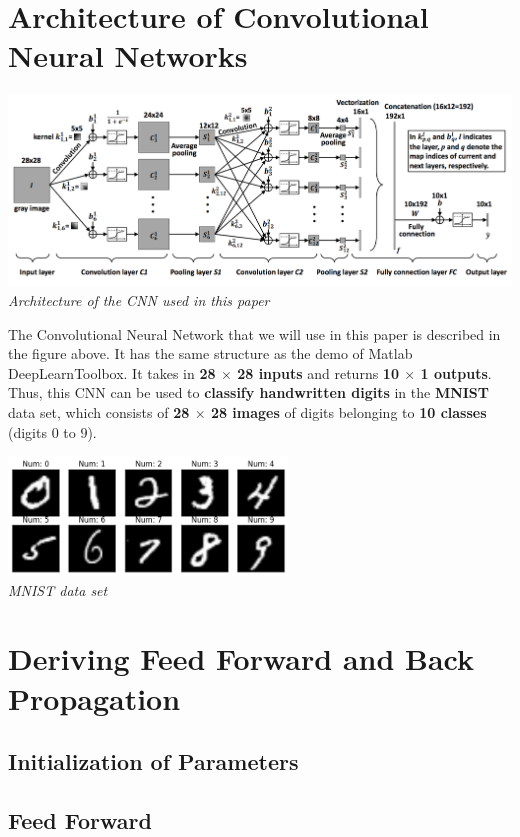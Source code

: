 \documentclass[12pt]{article}
\begin{document}
\section{Architecture of Convolutional Neural Networks}
\begin{center}
    \includegraphics[width=\textwidth]{CNN-architecture.png}\\
    \textit{Architecture of the CNN used in this paper}
\end{center}
The Convolutional Neural Network that we will use in this paper is described in the figure above. It has the same structure as the demo of Matlab DeepLearnToolbox. It takes in \textbf{28 $\times$ 28 inputs} and returns \textbf{10 $\times$ 1 outputs}. Thus, this CNN can be used to \textbf{classify handwritten digits} in the \textbf{MNIST} data set, which consists of \textbf{28 $\times$ 28 images} of digits belonging to \textbf{10 classes} (digits $0$ to $9$).
\begin{center}
    \includegraphics[width=280px]{mnist.png}\\
    \textit{MNIST data set}
\end{center}

\section{Deriving Feed Forward and Back Propagation}
\subsection{Initialization of Parameters}

\subsection{Feed Forward}
\end{document}
